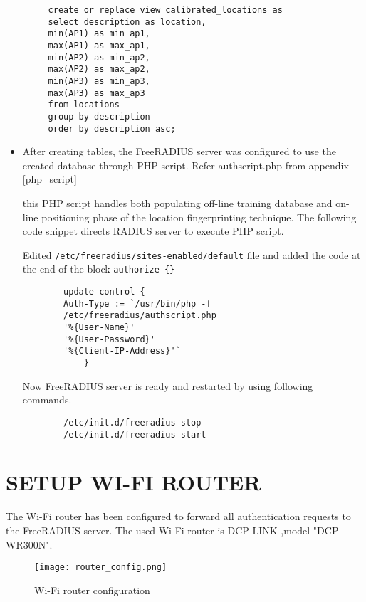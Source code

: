 \begin{itemize}
\begin{lstlisting}
	 create or replace view calibrated_locations as
	 select description as location,
	 min(AP1) as min_ap1,
	 max(AP1) as max_ap1,
	 min(AP2) as min_ap2,
	 max(AP2) as max_ap2,
	 min(AP3) as min_ap3,
	 max(AP3) as max_ap3 
	 from locations 
	 group by description
	 order by description asc;
 	\end{lstlisting}
 		\item After creating tables, the FreeRADIUS server was configured to use the created database through PHP script. Refer authscript.php from appendix \ref{php_script}
 		
 			\subitem this PHP script handles both populating off-line training database and on-line positioning phase of the location fingerprinting technique. The following code snippet directs RADIUS server to execute PHP script.\cite{freeradius_2}
 			
 			Edited \verb|/etc/freeradius/sites-enabled/default| file and added the code at the end of the block \verb|authorize {}|\cite{freeradius_php}
 			
 		\begin{lstlisting}
 		update control {
 		Auth-Type := `/usr/bin/php -f
 		/etc/freeradius/authscript.php 
 		'%{User-Name}' 
 		'%{User-Password}' 
 		'%{Client-IP-Address}'`
 			}
 		\end{lstlisting} 
 	
 		\subitem Now FreeRADIUS server is ready and restarted by using following commands.
 		\begin{lstlisting}
 		/etc/init.d/freeradius stop
 		/etc/init.d/freeradius start
 		\end{lstlisting}
 \end{itemize}

\newpage
\section{SETUP WI-FI ROUTER}
The Wi-Fi router has been configured to forward all authentication requests to the FreeRADIUS server. The used Wi-Fi router is DCP LINK ,model "DCP-WR300N".

\begin{center}
	\begin{figure*}[h]	
		\centering
		\texttt{[image: router\_config.png]}
		\caption{Wi-Fi router configuration}
	\end{figure*}
\end{center} 

